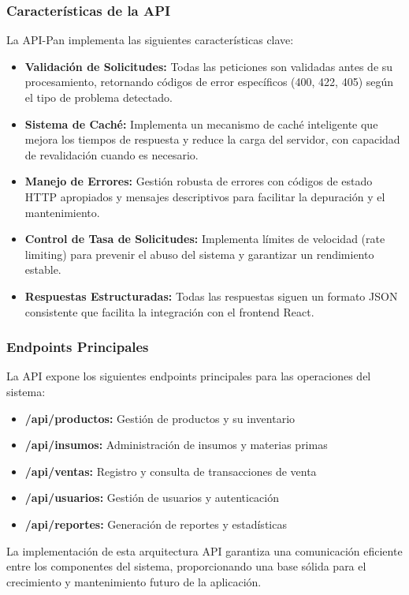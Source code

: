 \documentclass[conference]{IEEEtran}
\begin{document}
\subsubsection{Características de la API}
La API-Pan implementa las siguientes características clave:

\begin{itemize}
    \item \textbf{Validación de Solicitudes:} Todas las peticiones son validadas antes de su procesamiento, retornando códigos de error específicos (400, 422, 405) según el tipo de problema detectado.
    \item \textbf{Sistema de Caché:} Implementa un mecanismo de caché inteligente que mejora los tiempos de respuesta y reduce la carga del servidor, con capacidad de revalidación cuando es necesario.
    \item \textbf{Manejo de Errores:} Gestión robusta de errores con códigos de estado HTTP apropiados y mensajes descriptivos para facilitar la depuración y el mantenimiento.
    \item \textbf{Control de Tasa de Solicitudes:} Implementa límites de velocidad (rate limiting) para prevenir el abuso del sistema y garantizar un rendimiento estable.
    \item \textbf{Respuestas Estructuradas:} Todas las respuestas siguen un formato JSON consistente que facilita la integración con el frontend React.
\end{itemize}

\subsubsection{Endpoints Principales}
La API expone los siguientes endpoints principales para las operaciones del sistema:

\begin{itemize}
    \item \textbf{/api/productos:} Gestión de productos y su inventario
    \item \textbf{/api/insumos:} Administración de insumos y materias primas
    \item \textbf{/api/ventas:} Registro y consulta de transacciones de venta
    \item \textbf{/api/usuarios:} Gestión de usuarios y autenticación
    \item \textbf{/api/reportes:} Generación de reportes y estadísticas
\end{itemize}

La implementación de esta arquitectura API garantiza una comunicación eficiente entre los componentes del sistema, proporcionando una base sólida para el crecimiento y mantenimiento futuro de la aplicación.
\end{document}
